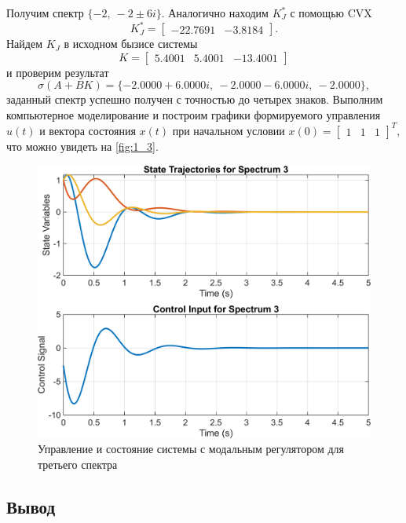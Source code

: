 Получим спектр $\{-2,\ -2\pm 6i\}$. Аналогично находим $K_J^*$ с помощью CVX
\begin{equation*}
    K_J^*=\begin{bmatrix}
        -22.7691&	-3.8184
    \end{bmatrix}.
\end{equation*}
Найдем $K_J$ в исходном бызисе
системы
\begin{equation*}
    K=\begin{bmatrix}
        5.4001&	5.4001&	-13.4001
    \end{bmatrix}
\end{equation*}
и проверим результат
\begin{equation*}
    \sigma(A+BK)=\{-2.0000 + 6.0000i,\ 
    -2.0000 - 6.0000i,\ 
    -2.0000\},
\end{equation*}
заданный спектр успешно получен с точностью до четырех знаков. 
Выполним компьютерное моделирование и построим графики 
формируемого управления $u(t)$ и вектора 
состояния $x(t)$ при начальном условии 
$x(0) =\begin{bmatrix}
    1 & 1 & 1
\end{bmatrix}^T$, что можно увидеть на \autoref{fig:1_3}.

\begin{figure}[H]
    \centering
    \includegraphics[width=0.9\linewidth]{figs/task1_3.png}
    \caption{Управление и состояние системы с модальным регулятором для третьего спектра}
    \label{fig:1_3}
\end{figure}

\subsection{Вывод}

